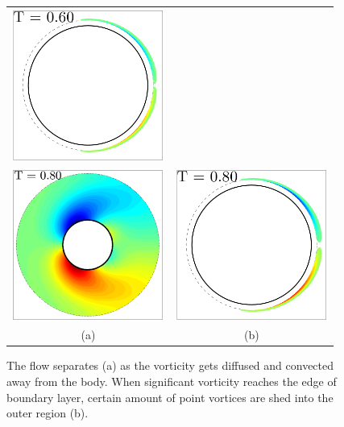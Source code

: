 \begin{figure}
\begin{center}
\begin{tabular}{cc}
 \includegraphics[width=5cm]{./Figures/results/static/vortices_T0_60.pdf}  \\
 \includegraphics[width=5cm]{./Figures/results/static/vorticity_T0_80.pdf} &
 \includegraphics[width=5cm]{./Figures/results/static/vortices_T0_80.pdf}  \\
 (a) & (b)
\end{tabular}
\end{center}
 \caption[Flow separates]{The flow separates (a) as the vorticity gets diffused and convected away from the body. When significant vorticity reaches the edge of boundary layer, certain amount of point vortices are shed into the outer region (b). }
 \label{fig:Separation}
\end{figure}


